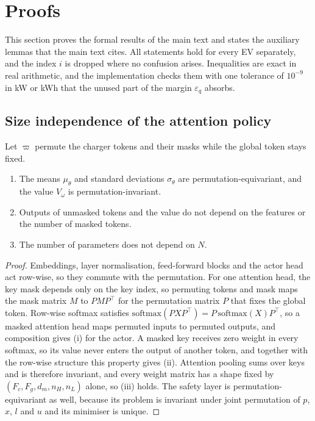 \section{Proofs}\label{app:proofs}

This section proves the formal results of the main text and states the auxiliary lemmas that the main text cites.
All statements hold for every EV separately, and the index $i$ is dropped where no confusion arises.
Inequalities are exact in real arithmetic, and the implementation checks them with one tolerance of $10^{-9}$ in kW or kWh that the unused part of the margin $\varepsilon_q$ absorbs.

\subsection{Size independence of the attention policy}\label{app:equivariance}

\begin{lemma}\label{lem:equivariance}
Let $\varpi$ permute the charger tokens and their masks while the global token stays fixed.
\begin{enumerate}
\item[(i)] The means $\mu_{\theta}$ and standard deviations $\sigma_{\theta}$ are permutation-equivariant, and the value $V_\omega$ is permutation-invariant.
\item[(ii)] Outputs of unmasked tokens and the value do not depend on the features or the number of masked tokens.
\item[(iii)] The number of parameters does not depend on $N$.
\end{enumerate}
\end{lemma}

\begin{proof}
Embeddings, layer normalisation, feed-forward blocks and the actor head act row-wise, so they commute with the permutation.
For one attention head, the key mask depends only on the key index, so permuting tokens and mask maps the mask matrix $M$ to $PMP^\top$ for the permutation matrix $P$ that fixes the global token.
Row-wise softmax satisfies $\mathrm{softmax}(PXP^\top)=P\,\mathrm{softmax}(X)P^\top$, so a masked attention head maps permuted inputs to permuted outputs, and composition gives (i) for the actor.
A masked key receives zero weight in every softmax, so its value never enters the output of another token, and together with the row-wise structure this property gives (ii).
Attention pooling sums over keys and is therefore invariant, and every weight matrix has a shape fixed by $(F_c,F_g,d_m,n_H,n_L)$ alone, so (iii) holds.
The safety layer is permutation-equivariant as well, because its problem is invariant under joint permutation of $p$, $x$, $l$ and $u$ and its minimiser is unique.
\end{proof}

